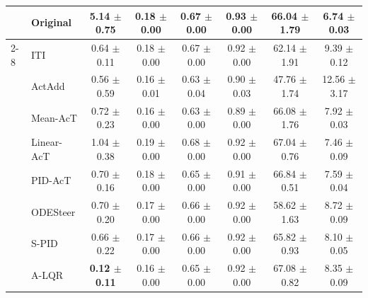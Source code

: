 \documentclass{article}
\theoremstyle{plain}
\theoremstyle{definition}
\theoremstyle{remark}
\begin{document}
\begin{table}[H]
\begin{threeparttable}
\begin{tabular}{ll|>{\columncolor{lightblue}}c|ccc|c|c}
    & Original & 5.14 {\tiny $\pm$0.75} & 0.18 {\tiny $\pm$0.00} & 0.67 {\tiny $\pm$0.00} & 0.93 {\tiny $\pm$0.00} & 66.04 {\tiny $\pm$1.79} & 6.74 {\tiny $\pm$0.03} \\
    \cmidrule(lr){2-8}
    \multirow{8}{*}{\rotatebox{90}{Llama-3-8B}} 
    & ITI & 0.64 {\tiny $\pm$0.11} & 0.18 {\tiny $\pm$0.00} & 0.67 {\tiny $\pm$0.00} & 0.92 {\tiny $\pm$0.00} & 62.14 {\tiny $\pm$1.91} & 9.39 {\tiny $\pm$0.12} \\
    & ActAdd & 0.56 {\tiny $\pm$0.59} & 0.16 {\tiny $\pm$0.01} & 0.63 {\tiny $\pm$0.04} & 0.90 {\tiny $\pm$0.03} & 47.76 {\tiny $\pm$1.74}    & 12.56 {\tiny $\pm$3.17} \\
    & Mean-AcT & 0.72 {\tiny $\pm$0.23} & 0.16 {\tiny $\pm$0.00} & 0.63 {\tiny $\pm$0.00} & 0.89 {\tiny $\pm$0.00} & 66.08 {\tiny $\pm$1.76} & 7.92 {\tiny $\pm$0.03} \\
    & Linear-AcT & 1.04 {\tiny $\pm$0.38} & 0.19 {\tiny $\pm$0.00} & 0.68 {\tiny $\pm$0.00} & 0.92 {\tiny $\pm$0.00} & 67.04 {\tiny $\pm$0.76} & 7.46 {\tiny $\pm$0.09} \\
    & PID-AcT & 0.70 {\tiny $\pm$0.16} & 0.18 {\tiny $\pm$0.00} & 0.65 {\tiny $\pm$0.00} & 0.91 {\tiny $\pm$0.00} & 66.84 {\tiny $\pm$0.51} & 7.59 {\tiny $\pm$0.04} \\
    & ODESteer &  0.70 {\tiny $\pm$0.20} & 0.17 {\tiny $\pm$0.00} & 0.66 {\tiny $\pm$0.00} & 0.92 {\tiny $\pm$0.00 } & 58.62 {\tiny $\pm$1.63} & 8.72 {\tiny $\pm$0.09} \\
    & S-PID &  0.66 {\tiny $\pm$0.22} & 0.17 {\tiny $\pm$0.00} & 0.66 {\tiny $\pm$0.00} & 0.92 {\tiny $\pm$0.00} & 65.82 {\tiny $\pm$0.93} & 8.10 {\tiny $\pm$0.05} \\
    & A-LQR &  \textbf{0.12 {\tiny $\pm$0.11}} & 0.16 {\tiny $\pm$0.00} & 0.65 {\tiny $\pm$0.00} & 0.92 {\tiny $\pm$0.00} & 67.08 {\tiny $\pm$0.82} & 8.35 {\tiny $\pm$0.09} \\
    \midrule



\end{tabular}
\end{threeparttable}
\end{table}
\end{document}
